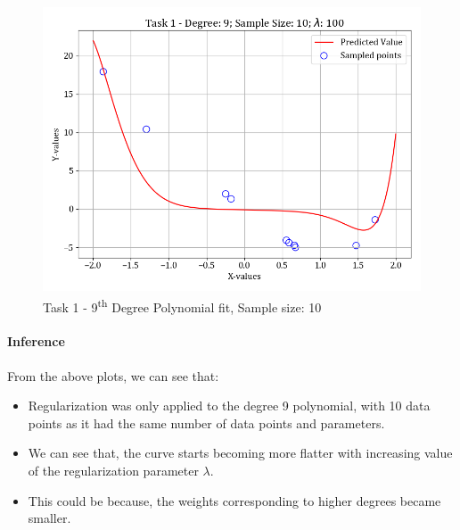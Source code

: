 \documentclass[12pt,a4paper]{article}
\begin{document}
\begin{figure}[H]
    \vspace{-2em}
    \centering
    \includegraphics[scale=0.45]{images/t1_d1/d_9_size_10_l_100.png}
    \caption{Task 1 - 9\textsuperscript{th} Degree Polynomial fit, Sample size: 10}
\end{figure}

\paragraph{Inference}
From the above plots, we can see that:
\begin{itemize}
    \itemsep0em
    \item Regularization was only applied to the degree 9 polynomial, with 10 data points as it had the same number of data points and parameters. 
    \item We can see that, the curve starts becoming more flatter with increasing value of the  regularization parameter $\lambda$.
    \item This could be because, the weights corresponding to higher degrees became smaller.
\end{itemize}
\end{document}
